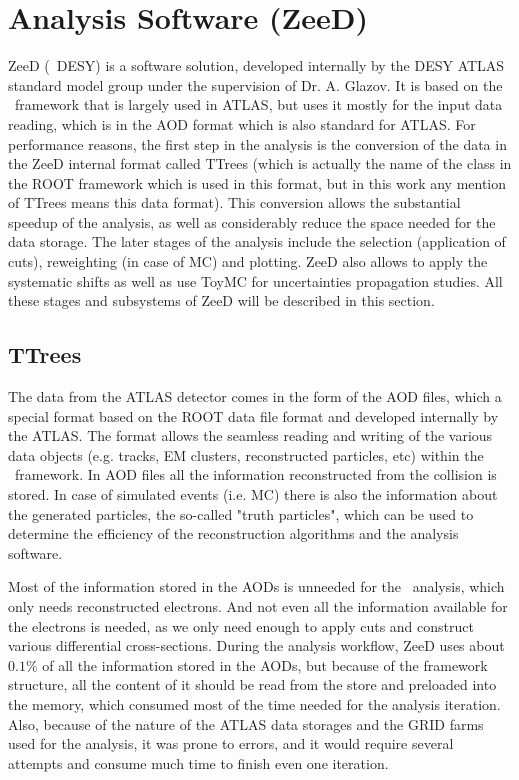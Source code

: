 \chapter{Analysis Software (ZeeD)}
\label{sec:ZeeD}
ZeeD (\Zee\ DESY) is a software solution, developed internally by the DESY ATLAS standard model group under the supervision of Dr. A. Glazov. It is based on the \Athena\ framework that is largely used in ATLAS, but uses it mostly for the input data reading, which is in the AOD format which is also standard for ATLAS. For performance reasons, the first step in the analysis is the conversion of the data in the ZeeD internal format called TTrees (which is actually the name of the class in the ROOT framework which is used in this format, but in this work any mention of TTrees means this data format). This conversion allows the substantial speedup of the analysis, as well as considerably reduce the space needed for the data storage. The later stages of the analysis include the selection (application of cuts), reweighting (in case of MC) and plotting. ZeeD also allows to apply the systematic shifts as well as use ToyMC for uncertainties propagation studies. All these stages and subsystems of ZeeD will be described in this section.

\section{TTrees}
\label{sec:ZeeD_TTrees}

The data from the ATLAS detector comes in the form of the AOD files, which a special format based on the ROOT data file format and developed internally by the ATLAS. The format allows the seamless reading and writing of the various data objects (e.g. tracks, EM clusters, reconstructed particles, etc) within the \Athena\ framework. In AOD files all the information reconstructed from the collision is stored. In case of simulated events (i.e. MC) there is also the information about the generated particles, the so-called "truth particles", which can be used to determine the efficiency of the reconstruction algorithms and the analysis software.

Most of the information stored in the AODs is unneeded for the \Zee\ analysis, which only needs reconstructed electrons. And not even all the information available for the electrons is needed, as we only need enough to apply cuts and construct various differential cross-sections. During the analysis workflow, ZeeD uses about $0.1\%$ of all the information stored in the AODs, but because of the framework structure, all the content of it should be read from the store and preloaded into the memory, which consumed most of the time needed for the analysis iteration. Also, because of the nature of the ATLAS data storages and the GRID farms used for the analysis, it was prone to errors, and it would require several attempts and consume much time to finish even one iteration.

